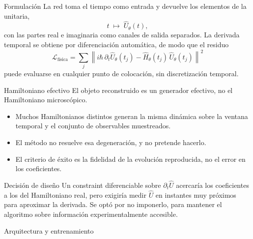 \documentclass[10pt,aspectratio=169]{beamer}
\newcommand{\Uop}{\hat{U}}
\newcommand{\Hop}{\hat{H}}
\begin{document}
\begin{frame}{Formulación}
  La red toma el tiempo como entrada y devuelve los elementos de la unitaria,
  \[
    t \;\longmapsto\; \Uop_\theta(t),
  \]
  con las partes real e imaginaria como canales de salida separados.
  \pause
  \vfill
  La derivada temporal se obtiene por diferenciación automática, de modo que el residuo
  \[
    \mathcal{L}_{\text{física}} = \sum_j \left\| i\hbar\, \partial_t \Uop_\theta(t_j) - \Hop_\theta(t_j)\, \Uop_\theta(t_j) \right\|^2
  \]
  puede evaluarse en cualquier punto de colocación, sin discretización temporal.
\end{frame}

\begin{frame}{Hamiltoniano efectivo}
  El objeto reconstruido es un generador efectivo, no el Hamiltoniano microscópico.
  \pause
  \vfill
  \begin{itemize}
    \item Muchos Hamiltonianos distintos generan la misma dinámica sobre la ventana temporal y el conjunto de observables muestreados.
    \item El método no resuelve esa degeneración, y no pretende hacerlo.
    \item El criterio de éxito es la fidelidad de la evolución reproducida, no el error en los coeficientes.
  \end{itemize}
  \pause
  \vfill
  \begin{block}{Decisión de diseño}
    Un constraint diferenciable sobre $\partial_t \Uop$ acercaría los coeficientes a los del Hamiltoniano real, pero exigiría medir $\Uop$ en instantes muy próximos para aproximar la derivada. Se optó por no imponerlo, para mantener el algoritmo sobre información experimentalmente accesible.
  \end{block}
\end{frame}

\begin{frame}{Arquitectura y entrenamiento}
  \begin{center}
  \end{center}
  \vfill
\end{frame}
\end{document}
